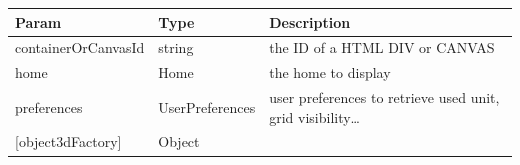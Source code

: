 \documentclass[a4paper]{report}
\begin{document}
\begin{longtable}[]{@{}lll@{}}
\toprule
\begin{minipage}[b]{0.30\columnwidth}\raggedright
Param\strut
\end{minipage} & \begin{minipage}[b]{0.30\columnwidth}\raggedright
Type\strut
\end{minipage} & \begin{minipage}[b]{0.30\columnwidth}\raggedright
Description\strut
\end{minipage}\tabularnewline
\midrule
\endhead
\begin{minipage}[t]{0.30\columnwidth}\raggedright
containerOrCanvasId\strut
\end{minipage} & \begin{minipage}[t]{0.30\columnwidth}\raggedright
string\strut
\end{minipage} & \begin{minipage}[t]{0.30\columnwidth}\raggedright
the ID of a HTML DIV or CANVAS\strut
\end{minipage}\tabularnewline
\begin{minipage}[t]{0.30\columnwidth}\raggedright
home\strut
\end{minipage} & \begin{minipage}[t]{0.30\columnwidth}\raggedright
Home\strut
\end{minipage} & \begin{minipage}[t]{0.30\columnwidth}\raggedright
the home to display\strut
\end{minipage}\tabularnewline
\begin{minipage}[t]{0.30\columnwidth}\raggedright
preferences\strut
\end{minipage} & \begin{minipage}[t]{0.30\columnwidth}\raggedright
UserPreferences\strut
\end{minipage} & \begin{minipage}[t]{0.30\columnwidth}\raggedright
user preferences to retrieve used unit, grid visibility\ldots{}\strut
\end{minipage}\tabularnewline
\begin{minipage}[t]{0.30\columnwidth}\raggedright
{[}object3dFactory{]}\strut
\end{minipage} & \begin{minipage}[t]{0.30\columnwidth}\raggedright
Object\strut
\end{minipage} & \begin{minipage}[t]{0.30\columnwidth}\raggedright

\end{minipage}
\end{longtable}
\end{document}
